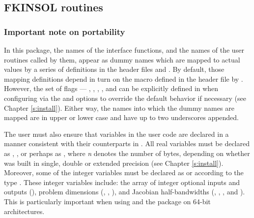 \subsection{FKINSOL routines}



\subsubsection{Important note on portability}

In this package, the names of the interface functions, and the names of
the {\F} user routines called by them, appear as dummy names
which are mapped to actual values by a series of definitions in the
header files  and .
By default, those mapping definitions depend in turn on the {\C} macro
 defined in the header file  by . However,
the set of flags --- , ,
, , and
 can be explicitly defined in  when
configuring {\sundials} via the  and
 options to override the default behavior if necessary
(see Chapter \ref{s:install}). Either way, the names into which the dummy names
are mapped are in upper or lower case and have up to two underscores appended.

The user must also ensure that variables in the user {\F} code are
declared in a manner consistent with their counterparts in {\kinsol}.
All real variables must be declared as , ,
or perhaps as , where {\em n} denotes the number of bytes,
depending on whether {\kinsol} was built in single, double or extended precision 
(see Chapter \ref{s:install}). Moreover, some of the {\F} integer variables
must be declared as  or  according to the 
{\C} type . These integer variables include: the array
of integer optional inputs and outputs (), problem dimensions (,
, ), and Jacobian half-bandwidths (, ,
, and ). This is particularly important when using
{\kinsol} and the {\fkinsol} package on 64-bit architectures.


